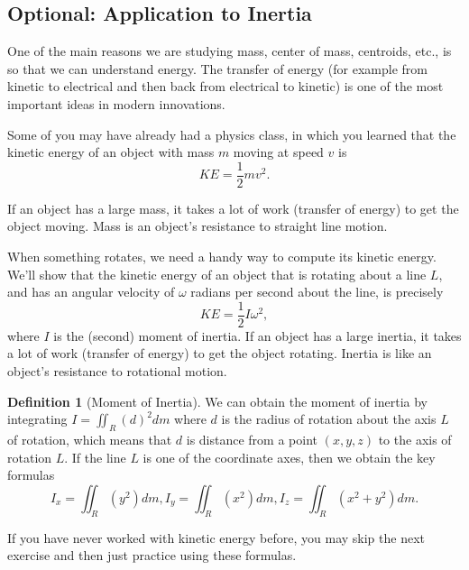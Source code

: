 \documentclass[10pt,]{book}
\theoremstyle{plain}
\theoremstyle{definition}
\newtheorem{definition}[theorem]{Definition}
\theoremstyle{definition}
\theoremstyle{definition}
\theoremstyle{definition}
\theoremstyle{definition}
\numberwithin{equation}{section}
\begin{document}
\typeout{************************************************}
\typeout{************************************************}
\subsection[{Optional: Application to Inertia}]{Optional: Application to Inertia}\label{subsection-62}
One of the main reasons we are studying mass, center of mass, centroids, etc., is so that we can understand energy. The transfer of energy (for example from kinetic to electrical and then back from electrical to kinetic) is one of the most important ideas in modern innovations.%
\par
Some of you may have already had a physics class, in which you learned that the kinetic energy of an object with mass \(m\) moving at speed \(v\) is%
\begin{equation*}
KE = \frac{1}{2}mv^2.
\end{equation*}
%
\par
If an object has a large mass, it takes a lot of work (transfer of energy) to get the object moving. Mass is an object's resistance to straight line motion.%
\par
When something rotates, we need a handy way to compute its kinetic energy. We'll show that the kinetic energy of an object that is rotating about a line \(L\), and has an angular velocity of \(\omega\) radians per second about the line, is precisely %
\begin{equation*}
KE = \frac{1}{2}I \omega^2,
\end{equation*}
where \(I\) is the (second) moment of inertia. If an object has a large inertia, it takes a lot of work (transfer of energy) to get the object rotating. Inertia is like an object's resistance to rotational motion.%
\begin{definition}[{Moment of Inertia}]\label{definition-42}
We can obtain the moment of inertia by integrating \(I=\iint_R (d)^2 dm\) where \(d\) is the radius of rotation about the axis \(L\) of rotation, which means that \(d\) is distance from a point \((x,y,z)\) to the axis of rotation \(L\). If the line \(L\) is one of the coordinate axes, then we obtain the key formulas%
\begin{equation*}
I_x = \iint_R (y^2)dm,
I_y = \iint_R (x^2)dm,
I_z = \iint_R (x^2+y^2)dm
.
\end{equation*}
%
\end{definition}
If you have never worked with kinetic energy before, you may skip the next exercise and then just practice using these formulas.%
\end{document}
